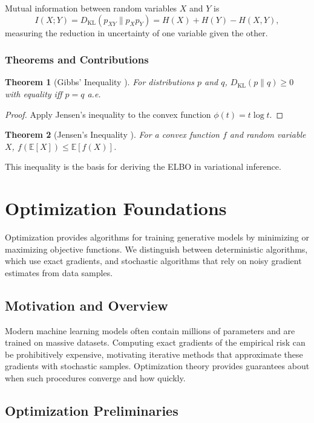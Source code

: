 \documentclass[11pt]{book}
\newtheorem{theorem}{Theorem}[chapter]
\begin{document}
Mutual information between random variables $X$ and $Y$ is
\begin{equation}
I(X;Y)=D_{\mathrm{KL}}(p_{XY}\|p_X p_Y)=H(X)+H(Y)-H(X,Y),
\end{equation}
measuring the reduction in uncertainty of one variable given the other.

\subsection{Theorems and Contributions}
\begin{theorem}[Gibbs' Inequality \cite{gibbs1873,shannon1948}]
For distributions $p$ and $q$, $D_{\mathrm{KL}}(p\|q)\ge0$ with equality iff $p=q$ a.e.
\end{theorem}
\begin{proof}
Apply Jensen's inequality to the convex function $\phi(t)=t\log t$.
\end{proof}

\begin{theorem}[Jensen's Inequality \cite{jensen1906}]
For a convex function $f$ and random variable $X$, $f(\mathbb{E}[X])\le\mathbb{E}[f(X)]$.
\end{theorem}
This inequality is the basis for deriving the ELBO in variational inference.

\chapter{Optimization Foundations}
Optimization provides algorithms for training generative models by minimizing or maximizing objective functions. We distinguish between deterministic algorithms, which use exact gradients, and stochastic algorithms that rely on noisy gradient estimates from data samples.

\section{Motivation and Overview}
Modern machine learning models often contain millions of parameters and are trained on massive datasets. Computing exact gradients of the empirical risk can be prohibitively expensive, motivating iterative methods that approximate these gradients with stochastic samples. Optimization theory provides guarantees about when such procedures converge and how quickly.

\section{Optimization Preliminaries}
\end{document}
